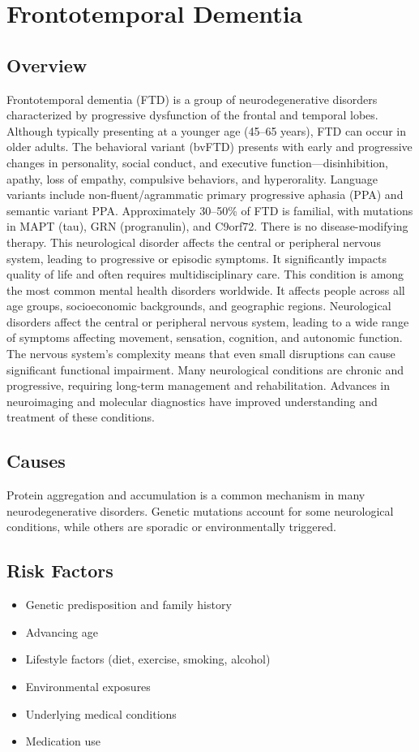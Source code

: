 \chapter{Frontotemporal Dementia}
\label{sec:geriatric:Frontotemporal Dementia}

\section{Overview}
Frontotemporal dementia (FTD) is a group of neurodegenerative disorders characterized by progressive dysfunction of the frontal and temporal lobes. Although typically presenting at a younger age (45--65 years), FTD can occur in older adults. The behavioral variant (bvFTD) presents with early and progressive changes in personality, social conduct, and executive function---disinhibition, apathy, loss of empathy, compulsive behaviors, and hyperorality. Language variants include non-fluent/agrammatic primary progressive aphasia (PPA) and semantic variant PPA. Approximately 30--50\% of FTD is familial, with mutations in MAPT (tau), GRN (progranulin), and C9orf72. There is no disease-modifying therapy. This neurological disorder affects the central or peripheral nervous system, leading to progressive or episodic symptoms. It significantly impacts quality of life and often requires multidisciplinary care. This condition is among the most common mental health disorders worldwide. It affects people across all age groups, socioeconomic backgrounds, and geographic regions. Neurological disorders affect the central or peripheral nervous system, leading to a wide range of symptoms affecting movement, sensation, cognition, and autonomic function. The nervous system's complexity means that even small disruptions can cause significant functional impairment. Many neurological conditions are chronic and progressive, requiring long-term management and rehabilitation. Advances in neuroimaging and molecular diagnostics have improved understanding and treatment of these conditions.
\section{Causes}
Protein aggregation and accumulation is a common mechanism in many neurodegenerative disorders.  Genetic mutations account for some neurological conditions, while others are sporadic or environmentally triggered.   
\section{Risk Factors}
\begin{itemize}[noitemsep]
  \item Genetic predisposition and family history
  \item Advancing age
  \item Lifestyle factors (diet, exercise, smoking, alcohol)
  \item Environmental exposures
  \item Underlying medical conditions
  \item Medication use
\end{itemize}
